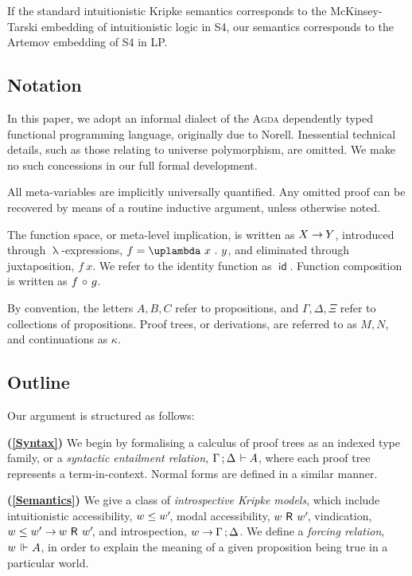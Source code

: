 \documentclass[submission,copyright,creativecommons,sharealike,backref=page]{eptcs}
\newcommand{\sA}{\mkern-2muA}
\newcommand{\R}{\mathrel{\rlap{$\mkern.75mu\textsf{R}$}\hphantom{\subseteq}}}
\renewcommand{\:}{\mathop{\mkern3mu:\mkern3mu}}
\renewcommand{\.}{\mathop{\mkern3mu.\mkern3mu}}
\renewcommand{\;}{\mathop{;}}
\renewcommand{\,}{\mathop{,}}
\renewcommand{\o}{\mathop{\mkern3mu\circ\mkern3mu}}
\newcommand{\id}{\operatorname{\textsf{id}}}
\newcommand{\e}{\mathrel{\mkern2mu\vdash\mkern1mu}}
\newcommand{\ee}{\mathrel{\mkern2mu\Vdash\mkern1mu}}
\renewcommand{\r}{\mathrel{\rightarrow\mkern-1mu}}
\theoremstyle{mystyle}
\begin{document}
If the standard intuitionistic Kripke semantics corresponds to the McKinsey-Tarski\cite{McKinseyT48} embedding of intuitionistic logic in S4, our semantics corresponds to the Artemov embedding of S4 in LP.


\subsection*{Notation}

In this paper, we adopt an informal dialect of the \textsc{Agda} dependently typed functional programming language, originally due to Norell\cite{Norell07}.  Inessential technical details, such as those relating to universe polymorphism, are omitted.  We make no such concessions in our full formal development.

All meta-variables are implicitly universally quantified.  Any omitted proof can be recovered by means of a routine inductive argument, unless otherwise noted.  

The function space, or meta-level implication, is written as $X \r Y$, introduced through $\uplambda$-expressions, $f = \uplambda~x \. y$, and eliminated through juxtaposition, $f~x$.  We refer to the identity function as $\id$.  Function composition is written as $f \o g$.

By convention, the letters $A, B, C$ refer to propositions, and $\Gamma, \Delta, \Xi$ refer to collections of propositions.  Proof trees, or derivations, are referred to as $M, N$, and continuations as $\kappa$.


\subsection*{Outline}

Our argument is structured as follows:

\textbf{(\ref{Syntax})} We begin by formalising a calculus of proof trees as an indexed type family, or a \emph{syntactic entailment relation,} $\Gamma \; \Delta \e \sA$, where each proof tree represents a term-in-context.  Normal forms are defined in a similar manner.

\textbf{(\ref{Semantics})} We give a class of \emph{introspective Kripke models}, which include intuitionistic accessibility, $w \le w'\mkern-3mu$, modal accessibility, $w \R w'\mkern-3mu$, vindication, $w \le w' \r w \R w'\mkern-3mu$, and introspection, $w \r \Gamma \; \Delta$.  We define a \emph{forcing relation}, $w \ee A$, in order to explain the meaning of a given proposition being true in a particular world.
\end{document}
